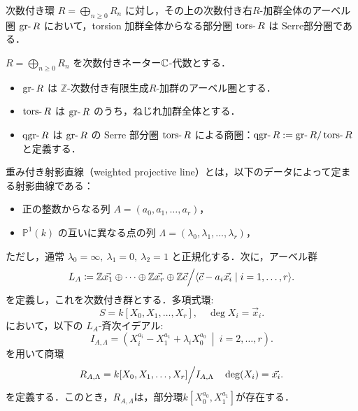 \begin{prop}
次数付き環 \( R = \bigoplus_{n \ge 0} R_n \) に対し，その上の次数付き右$R$-加群全体のアーベル圏 \(\gr R\) において，torsion 加群全体からなる部分圏 \(\tors R\) は Serre部分圏である．
\end{prop}

\begin{defn}\cite{AZ94}
\(
R = \bigoplus_{n \ge 0} R_n
\) を次数付きネーター${\mathbb C}$-代数とする．\vspace{-3mm}
\begin{itemize}
  \item $\gr R$ は $\mathbb{Z}$-次数付き有限生成$R$-加群のアーベル圏とする．
  \item $\tors R$ は $\gr R$ のうち，ねじれ加群全体とする．
  \item $\qgr R$ は $\gr R$ の Serre 部分圏 $\tors R$ による商圏：$\qgr R := \gr R / \tors R$ と定義する．
\end{itemize}
\end{defn}

\begin{defn}\cite{GL87}
重み付き射影直線（weighted projective line）とは，以下のデータによって定まる射影曲線である：

\begin{itemize}
  \item 正の整数からなる列 $A = (a_0, a_1, \dots, a_r)$，
  \item $\mathbb{P}^1(k)$ の互いに異なる点の列 $\Lambda = (\lambda_0, \lambda_1, \dots, \lambda_r)$，
\end{itemize}

ただし，通常 $\lambda_0 = \infty,\ \lambda_1 = 0,\ \lambda_2 = 1$ と正規化する．次に，アーベル群
\[
	L_{A} \coloneq {\mathbb Z} \vec{x_1}\oplus\cdots\oplus{\mathbb Z} \vec{x_r}\oplus {\mathbb Z}\vec{c}\Big{/}\langle\vec{c} -a_i\vec{x_i}\mid i=1,\ldots,r\rangle.
\]
を定義し，これを次数付き群とする．多項式環: 
\[
	S = k[X_0, X_1, \dots, X_r], \quad \deg X_i = \vec{x}_i. 
\]
において，以下の $L_A$-斉次イデアル:
\[
	I_{A,\Lambda} = \left( X_i^{a_i} - X_1^{a_1} + \lambda_i X_0^{a_0} \ \middle|\ i = 2, \dots, r \right).
\]
を用いて商環
\[
	R_{A,\Lambda} = k[X_0, X_1, \dots, X_r]\Big{/}I_{A,\Lambda} \quad \deg(X_i)=\vec{x_i}.
\]
を定義する．このとき，$R_{A,\Lambda}$は，部分環$k[X_0^{a_0},X_1^{a_1}]$が存在する．
\end{defn}

